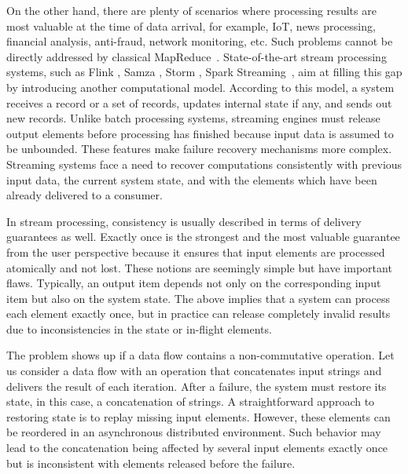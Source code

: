 On the other hand, there are plenty of scenarios where processing results are most valuable at the time of data arrival, for example, IoT, news processing, financial analysis, anti-fraud, network monitoring, etc. Such problems cannot be directly addressed by classical MapReduce~\cite{Doulkeridis:2014:SLA:2628707.2628782}. State-of-the-art stream processing systems, such as Flink \cite{carbone2015apache}, Samza \cite{Noghabi:2017:SSS:3137765.3137770}, Storm \cite{apache:storm}, Spark Streaming~\cite{Zaharia:2012:DSE:2342763.2342773}, aim at filling this gap by introducing another computational model. According to this model, a system receives a record or a set of records, updates internal state if any, and sends out new records. Unlike batch processing systems, streaming engines must release output elements before processing has finished because input data is assumed to be unbounded. These features make failure recovery mechanisms more complex. Streaming systems face a need to recover computations consistently with previous input data, the current system state, and with the elements which have been already delivered to a consumer.

In stream processing, consistency is usually described in terms of delivery guarantees as well. Exactly once is the strongest and the most valuable guarantee from the user perspective because it ensures that input elements are processed atomically and not lost. These notions are seemingly simple but have important flaws. Typically, an output item depends not only on the corresponding input item but also on the system state. The above implies that a system can process each element exactly once, but in practice can release completely invalid results due to inconsistencies in the state or in-flight elements.

The problem shows up if a data flow contains a non-commutative operation. Let us consider a data flow with an operation that concatenates input strings and delivers the result of each iteration. 
After a failure, the system must restore its state, in this case, a concatenation of strings. 
A straightforward approach to restoring state is to replay missing input elements. 
However, these elements can be reordered in an asynchronous distributed environment. 
Such behavior may lead to the concatenation being affected by several input elements exactly once but is inconsistent with elements released before the failure.

